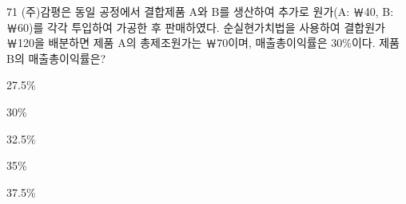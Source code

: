 \begin{question}{71}
(주)감평은 동일 공정에서 결합제품 A와 B를 생산하여 추가로 원가(A: ￦40, B: ￦60)를 각각 투입하여 가공한 후 판매하였다. 순실현가치법을 사용하여 결합원가 ￦120을 배분하면 제품 A의 총제조원가는 ￦70이며, 매출총이익률은 30\%이다. 제품 B의 매출총이익률은?
\begin{choices}
  \item 27.5\%
  \item 30\%
  \item 32.5\%
  \item 35\%
  \item 37.5\%
\end{choices}
\end{question}
